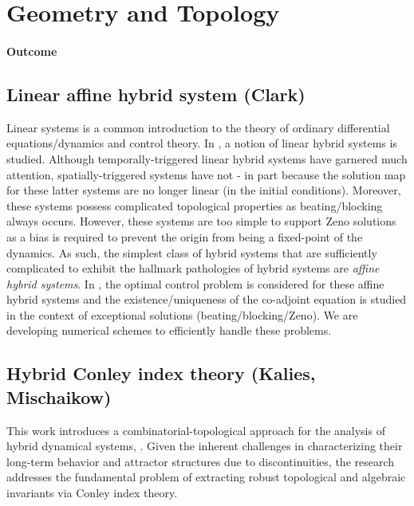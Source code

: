 \documentclass[letterpaper,11pt]{article}
\begin{document}
\newpage

\section{Geometry and Topology}
\paragraph*{Outcome}

\subsection{Linear affine hybrid system (Clark)}\label{affine HS}
Linear systems is a common introduction to the theory of ordinary differential equations/dynamics and control theory. In \cite{clark_linear}, a notion of linear hybrid systems is studied. Although temporally-triggered linear hybrid systems have garnered much attention, spatially-triggered systems have not - in part because the solution map for these latter systems are no longer linear (in the initial conditions). Moreover, these systems possess complicated topological properties as beating/blocking always occurs. However, these systems are too simple to support Zeno solutions as a bias is required to prevent the origin from being a fixed-point of the dynamics. As such, the simplest class of hybrid systems that are sufficiently complicated to exhibit the hallmark pathologies of hybrid systems are \textit{affine hybrid systems}. In \cite{clark_linear}, the optimal control problem is considered for these affine hybrid systems and the existence/uniqueness of the co-adjoint equation is studied in the context of exceptional solutions (beating/blocking/Zeno). We are developing numerical schemes to efficiently handle these problems.

\subsection{Hybrid Conley index theory (Kalies, Mischaikow)}\label{hybrid Conley}

This work introduces a combinatorial-topological approach for the  analysis of hybrid dynamical systems, \cite{KaRi-hybridCIT}. Given the inherent challenges in characterizing their long-term behavior and attractor structures due to discontinuities, the research addresses the fundamental problem of extracting robust topological and algebraic invariants via Conley index theory.
\end{document}
